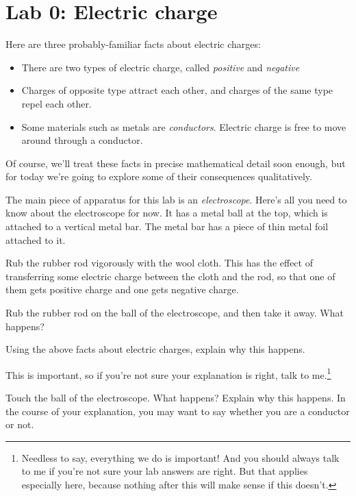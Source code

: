 \documentclass{article}
\begin{document}
\section*{Lab 0: Electric charge}

Here are three probably-familiar facts about electric charges:

\begin{itemize}
\item There are two types of electric charge, called \textit{positive}
and \textit{negative}
\item Charges of opposite type attract each other, and charges of the same type
repel each other.
\item Some materials such as metals are \textit{conductors}. Electric charge 
is free to move around through a conductor. 
\end{itemize}

Of course, we'll treat these facts in precise mathematical detail soon
enough, but for today we're going to explore some of their consequences 
qualitatively.

The main piece of apparatus for this lab is an \textit{electroscope}. 
Here's all you need to know about the electroscope for now. It has
a metal ball at the top, which is attached to a vertical metal bar.
The metal bar has a piece of thin metal foil attached to it. 

Rub the rubber rod vigorously with the wool cloth.
This has the effect of transferring some electric charge between the
cloth and the rod, so that one of them gets positive charge and one gets
negative charge.

Rub the rubber rod on the ball of the electroscope, and then take it away.
What happens?

\vskip 1in

Using the above facts about electric charges, explain why this happens.

\vskip 1in

This is important, so if you're not sure your explanation is
right, talk to me.\footnote{Needless to say, everything we do
is important! And you should always talk to me if you're not sure your
lab answers are right. But that applies especially here, because nothing
after this will make sense if this doesn't.}

Touch the ball of the electroscope. What happens? Explain why this
happens.  In the course of your explanation, you may want to say
whether you are a conductor or not.

\vskip 1.5in
\end{document}
